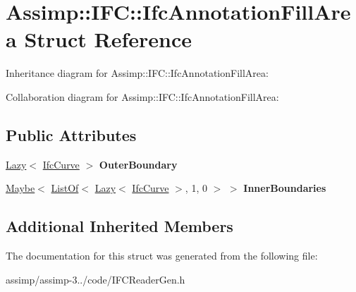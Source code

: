 \hypertarget{struct_assimp_1_1_i_f_c_1_1_ifc_annotation_fill_area}{\section{Assimp\+:\+:I\+F\+C\+:\+:Ifc\+Annotation\+Fill\+Area Struct Reference}
\label{struct_assimp_1_1_i_f_c_1_1_ifc_annotation_fill_area}
}


Inheritance diagram for Assimp\+:\+:I\+F\+C\+:\+:Ifc\+Annotation\+Fill\+Area\+:


Collaboration diagram for Assimp\+:\+:I\+F\+C\+:\+:Ifc\+Annotation\+Fill\+Area\+:
\subsection*{Public Attributes}
\begin{DoxyCompactItemize}
\item 
\hypertarget{struct_assimp_1_1_i_f_c_1_1_ifc_annotation_fill_area_aaed74323cde0040cd32fd7dcd64426a8}{\hyperlink{struct_assimp_1_1_s_t_e_p_1_1_lazy}{Lazy}$<$ \hyperlink{struct_assimp_1_1_i_f_c_1_1_ifc_curve}{Ifc\+Curve} $>$ {\bfseries Outer\+Boundary}}\label{struct_assimp_1_1_i_f_c_1_1_ifc_annotation_fill_area_aaed74323cde0040cd32fd7dcd64426a8}

\item 
\hypertarget{struct_assimp_1_1_i_f_c_1_1_ifc_annotation_fill_area_a9f2972f85cdcb834a935f7dad0e2af41}{\hyperlink{struct_assimp_1_1_s_t_e_p_1_1_maybe}{Maybe}$<$ \hyperlink{struct_assimp_1_1_s_t_e_p_1_1_list_of}{List\+Of}$<$ \hyperlink{struct_assimp_1_1_s_t_e_p_1_1_lazy}{Lazy}$<$ \hyperlink{struct_assimp_1_1_i_f_c_1_1_ifc_curve}{Ifc\+Curve} $>$, 1, 0 $>$ $>$ {\bfseries Inner\+Boundaries}}\label{struct_assimp_1_1_i_f_c_1_1_ifc_annotation_fill_area_a9f2972f85cdcb834a935f7dad0e2af41}

\end{DoxyCompactItemize}
\subsection*{Additional Inherited Members}


The documentation for this struct was generated from the following file\+:\begin{DoxyCompactItemize}
\item 
assimp/assimp-\/3../code/I\+F\+C\+Reader\+Gen.\+h\end{DoxyCompactItemize}

